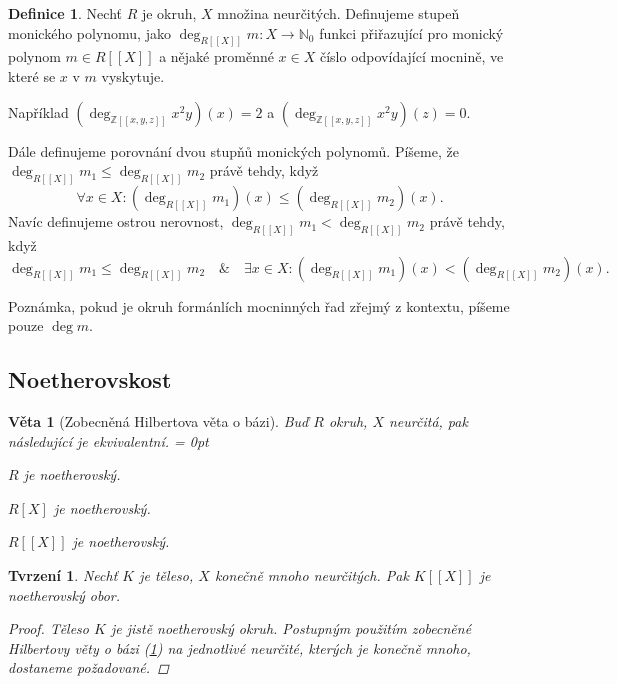\documentclass[11pt,a4paper]{article}
\newcommand\m[1]{\mathbb { #1 }} %
\newcommand\N{\m N}
\newenvironment{itemsn}{%
	\enumerate%
	\itemsep = 0pt%
}{%
	\endenumerate%
}
\newcounter{numb}
\theoremstyle{definition}
\newtheorem*{definice}{Definice}
\theoremstyle{plain}
\newtheorem{veta}[numb]{Věta}
\newtheorem{tvrzeni}[numb]{Tvrzení}
\begin{document}
\begin{definice}
	Nechť $R$ je okruh, $X$ množina neurčitých. Definujeme stupeň monického polynomu, jako $\deg_{R[[X]]} m\colon X \to \N_0$ funkci přiřazující pro monický polynom $m \in R[[X]]$ a nějaké proměnné $x \in X$ číslo odpovídající mocnině, ve které se $x$ v $m$ vyskytuje.

	Například $(\deg_{\m Z[[x,y,z]]} x^2y)(x) = 2$ a $(\deg_{\m Z[[x,y,z]]} x^2y)(z) = 0$.

	Dále definujeme porovnání dvou stupňů monických polynomů. Píšeme, že $\deg_{R[[X]]} m_1 \leq \deg_{R[[X]]} m_2$ právě tehdy, když
	\[
	\forall x \in X\colon (\deg_{R[[X]]} m_1)(x) \leq (\deg_{R[[X]]} m_2)(x).
	\]
	Navíc definujeme ostrou nerovnost, $\deg_{R[[X]]} m_1 < \deg_{R[[X]]} m_2$ právě tehdy, když
	\[
	\deg_{R[[X]]} m_1 \leq \deg_{R[[X]]} m_2 \quad\&\quad \exists x \in X\colon (\deg_{R[[X]]} m_1)(x) < (\deg_{R[[X]]} m_2)(x).
	\]

	Poznámka, pokud je okruh formánlích mocninných řad zřejmý z kontextu, píšeme pouze $\deg m$.
\end{definice}


\subsection{Noetherovskost}

\begin{veta}[Zobecněná Hilbertova věta o bázi] \label{thm:GHB}
	Buď $R$ okruh, $X$ neurčitá, pak následující je ekvivalentní.
	\begin{itemsn}
		\item $R$ je noetherovský.
		\item $R[X]$ je noetherovský.
		\item $R[[X]]$ je noetherovský.
	\end{itemsn}
\end{veta}

\begin{tvrzeni} \label{thm:KX_noe}
	Nechť $K$ je těleso, $X$ konečně mnoho neurčitých. Pak $K[[X]]$ je noetherovský obor.

	\begin{proof}
		Těleso $K$ je jistě noetherovský okruh. Postupným použitím zobecněné Hilbertovy věty o bázi (\ref{thm:GHB}) na jednotlivé neurčité, kterých je konečně mnoho, dostaneme požadované.
	\end{proof}
\end{tvrzeni}
\end{document}
